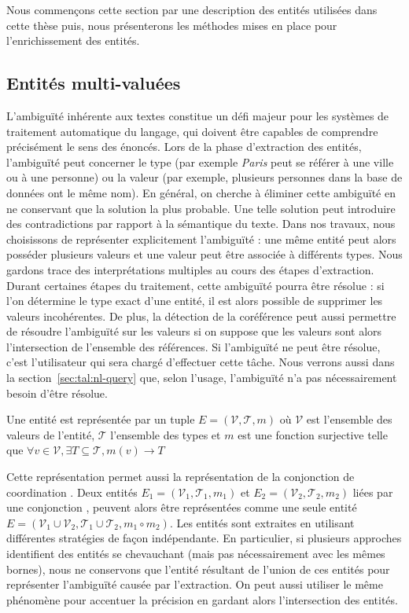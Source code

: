Nous commençons cette section par une description des entités utilisées dans cette thèse puis, nous présenterons les méthodes mises en place pour l'enrichissement des entités.

\subsection{Entités multi-valuées}

L'ambiguïté inhérente aux textes constitue un défi majeur pour les systèmes de traitement automatique du langage, qui doivent être capables de comprendre précisément le sens des énoncés.
Lors de la phase d'extraction des entités, l'ambiguïté peut concerner le type (par exemple \textit{Paris} peut se référer à une ville ou à une personne) ou la valeur (par exemple, plusieurs personnes dans la base de données ont le même nom).
En général, on cherche à éliminer cette ambiguïté en ne conservant que la solution la plus probable.
Une telle solution peut introduire des contradictions par rapport à la sémantique du texte.
Dans nos travaux, nous choisissons de représenter explicitement l'ambiguïté : une même entité peut alors posséder plusieurs valeurs et une valeur peut être associée à différents types.
Nous gardons trace des interprétations multiples au cours des étapes d'extraction.
Durant certaines étapes du traitement, cette ambiguïté pourra être résolue : si l'on détermine le type exact d'une entité, il est alors possible de supprimer les valeurs incohérentes.
De plus, la détection de la coréférence peut aussi permettre de résoudre l'ambiguïté sur les valeurs si on suppose que les valeurs sont alors l'intersection de l'ensemble des références.
Si l'ambiguïté ne peut être résolue, c'est l'utilisateur qui sera chargé d'effectuer cette tâche.
Nous verrons aussi dans la section~\ref{sec:tal:nl-query} que, selon l'usage, l'ambiguïté n'a pas nécessairement besoin d'être résolue.

\begin{definition}
    Une entité est représentée par un tuple $E = (\mathcal{V}, \mathcal{T},  m)$ où $\mathcal{V}$ est l'ensemble des valeurs de l'entité, $\mathcal{T}$ l'ensemble des types et $m$ est une fonction surjective telle que $\forall v \in \mathcal{V}, \exists T \subseteq \mathcal{T}, m(v) \rightarrow T$
\end{definition}

Cette représentation permet aussi la représentation de la conjonction de coordination .
Deux entités $E_1 = (\mathcal{V}_1, \mathcal{T}_1, m_1)$ et $E_2 = (\mathcal{V}_2, \mathcal{T}_2, m_2)$ liées par une conjonction , peuvent alors être représentées comme une seule entité $E = (\mathcal{V}_1 \cup \mathcal{V}_2, \mathcal{T}_1 \cup \mathcal{T}_2, m_1 \circ m_2)$.
Les entités sont extraites en utilisant différentes stratégies de façon indépendante.
En particulier, si plusieurs approches identifient des entités se chevauchant (mais pas nécessairement avec les mêmes bornes), nous ne conservons que l'entité résultant de l'union de ces entités pour représenter l'ambiguïté causée par l'extraction.
On peut aussi utiliser le même phénomène pour accentuer la précision en gardant alors l'intersection des entités.

